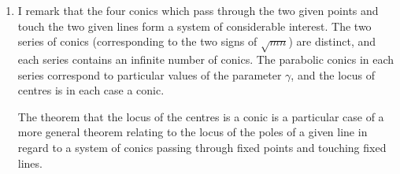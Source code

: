 \documentclass[12pt,a4paper]{article}
\theoremstyle{plain}
\theoremstyle{definition}
\theoremstyle{remark}
\begin{document}
\begin{enumerate}[label=\arabic*.]
The line drawn from the fixed point on the chord of contact to the centre has for its equation
\[x + y\sqrt{mn} + \gamma' z = 0,\]
where, writing for $x$, $y$, $z$ the coordinates of the centre, we have
\[-\gamma\{1 + \sqrt{mn}\} + 2\sqrt{mn} + \gamma'\{\sqrt{mn} + 1 + \tfrac{1}{4}(\sqrt{m} - \sqrt{n})^2\} = 0,\]
that is
\[\gamma' = \frac{\gamma\{1 + \sqrt{mn}\} - 2\sqrt{mn}}{\sqrt{mn} + 1 + \tfrac{1}{4}(\sqrt{m} - \sqrt{n})^2}.\]

\item I remark that the four conics which pass through the two given points and touch the two given lines form a system of considerable interest. The two series of conics (corresponding to the two signs of $\sqrt{mn}$) are distinct, and each series contains an infinite number of conics. The parabolic conics in each series correspond to particular values of the parameter $\gamma$, and the locus of centres is in each case a conic.

The theorem that the locus of the centres is a conic is a particular case of a more general theorem relating to the locus of the poles of a given line in regard to a system of conics passing through fixed points and touching fixed lines.
\end{enumerate}
\end{document}
